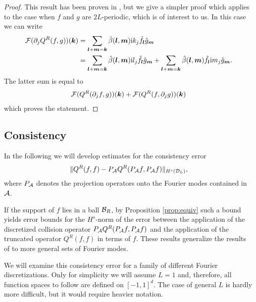 \begin{proof}
    This result has been proven in \cite{Villani98}, but we give a simpler
    proof which applies to the case when $f$ and $g$ are $2L$-periodic, which
    is of interest to us. In this case we can write
    \begin{align*}
        \mathcal{F}(\partial_j Q^R(f,g))({\bm k})
            &= \sum_{{\bm l}+{\bm m} = {\bm k}}\hat\beta({\bm l},{\bm m})\mathrm{i} k_j\hat f_{\bm l} \hat g_{\bm m}
            \\
            &= \sum_{{\bm l}+{\bm m} = {\bm k}}\hat\beta({\bm l},{\bm m})\mathrm{i} l_j\hat f_{\bm l} \hat g_{\bm m}
            + \sum_{{\bm l}+{\bm m} = {\bm k}}\hat\beta({\bm l},{\bm m})\hat f_{\bm l} \mathrm{i} m_j\hat g_{\bm m}.
    \end{align*}
    The latter sum is equal to
    \[
        \mathcal{F}(Q^R(\partial_jf,g))({\bm k})+
                \mathcal{F}(Q^R(f,\partial_j g))({\bm k})
    \]
    which proves the statement.
\end{proof}

\subsection{Consistency}
In the following we will develop estimates for the consistency error
\[
    \|Q^R(f,f) - {P_{\mathcal{A}}} Q^R({P_{\mathcal{A}}} f,{P_{\mathcal{A}}} f)\|_{H^s(\mathcal{D}_L)},
\]
where ${P_{\mathcal{A}}}$ denotes the projection operators onto the Fourier modes contained
in $\mathcal{A}$.

If the support of $f$ lies in a ball $\mathcal{B}_R$, by Proposition \ref{prop:equiv} such a bound yields error bounds
for the $H^s$-norm of the error between the application of the discretized collision operator ${P_{\mathcal{A}}} Q^R({P_{\mathcal{A}}}
f,{P_{\mathcal{A}}} f)$ and the application of the truncated operator $Q^R(f,f)$ in terms of $f$.  These results generalize
the results of \cite{Pareschi00} to more general sets of Fourier modes. 

We will examine this consistency error for a family of different Fourier
discretizations. Only for simplicity we will assume $L = 1$ and, therefore, all
function spaces to follow are defined on $[-1,1]^d$. The case of general $L$ is
hardly more difficult, but it would require heavier notation.

